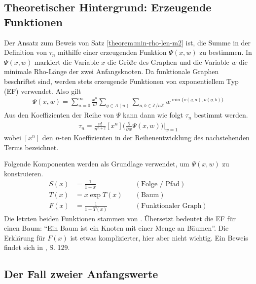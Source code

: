 \documentclass[a4paper, 10pt, ngerman]{article}
\newcommand{\Z}{\mathbb{Z}}
\begin{document}
    \subsection{Theoretischer Hintergrund: Erzeugende Funktionen}

    Der Ansatz zum Beweis von Satz \ref{theorem:min-rho-len-m2} ist, die Summe in der Definition von $\tau_n$ mithilfe einer erzeugenden Funktion $\Psi(x, w)$ zu bestimmen. In $\Psi(x, w)$ markiert die Variable $x$ die Größe des Graphen und die Variable $w$ die minimale Rho-Länge der zwei Anfangsknoten. Da funktionale Graphen beschriftet sind, werden stets erzeugende Funktionen von exponentiellem Typ (EF) verwendet. Also gilt
    \begin{align}
        \Psi(x, w)
        = \sum_{n = 0}^\infty \frac {x^n}{n!} \sum_{g \in A(n)}
        \sum_{a, b \in \Z/n\Z} w^{\min\{\nu(g, a), \nu(g, b)\}}
        \label{psi-definition}
    \end{align}
    Aus den Koeffizienten der Reihe von $\Psi$ kann dann wie folgt $\tau_n$ bestimmt werden.
    \begin{align*}
        \tau_n = \frac {n!}{n^{n + 2}} [x^n] \Bigg (\frac {\partial} {\partial w} \Psi(x, w) \Bigg ) \Bigg \vert_{w = 1}
    \end{align*}
    wobei $[x^n]$ den $n$-ten Koeffizienten in der Reihenentwicklung des nachstehenden Terms bezeichnet.

    Folgende Komponenten werden als Grundlage verwendet, um $\Psi(x, w)$ zu konstruieren.
    \begin{align*}
        S(x) & = \frac 1 {1 - x}    & \quad (\text{Folge / Pfad})       \\
        T(x) & = x \exp T(x)        & \quad (\text{Baum})               \\
        F(x) & = \frac 1 {1 - T(x)} & \quad (\text{Funktionaler Graph})
    \end{align*}
    Die letzten beiden Funktionen stammen von \cite{fo90}. Übersetzt bedeutet die EF für einen Baum: "`Ein Baum ist ein Knoten mit einer Menge an Bäumen"'. Die Erklärung für $F(x)$ ist etwas komplizierter, hier aber nicht wichtig. Ein Beweis findet sich in \cite{fs09}, S. 129.

    \subsection{Der Fall zweier Anfangswerte}
\end{document}
